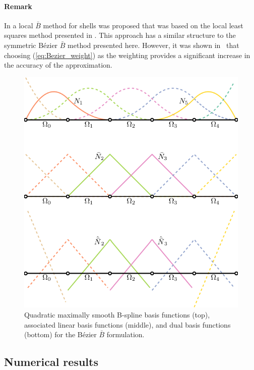 \paragraph{Remark} In \cite{bouclier_efficient_2013} a local $\bar{B}$ method for shells was proposed that was based on the local least squares method presented in \cite{govindjee_convergence_2012}. This approach has a similar structure to the {symmetric B\'ezier $\bar{B}$} method presented here. However, it was shown in~\cite{thomas_bezier_2015} that choosing (\ref{eq:Bezier_weight}) as the weighting provides a significant increase in the accuracy of the approximation.

\begin{figure}[htb!]
    \centering
    \includegraphics[width=.7\linewidth]{basis_dual}
    \caption{Quadratic maximally smooth B-spline basis functions (top), associated linear basis functions (middle), and dual basis functions (bottom) for the B\'ezier $\bar{B}$ formulation.}
    \label{fig:IGAelement}
\end{figure}

\subsection{Numerical results}

